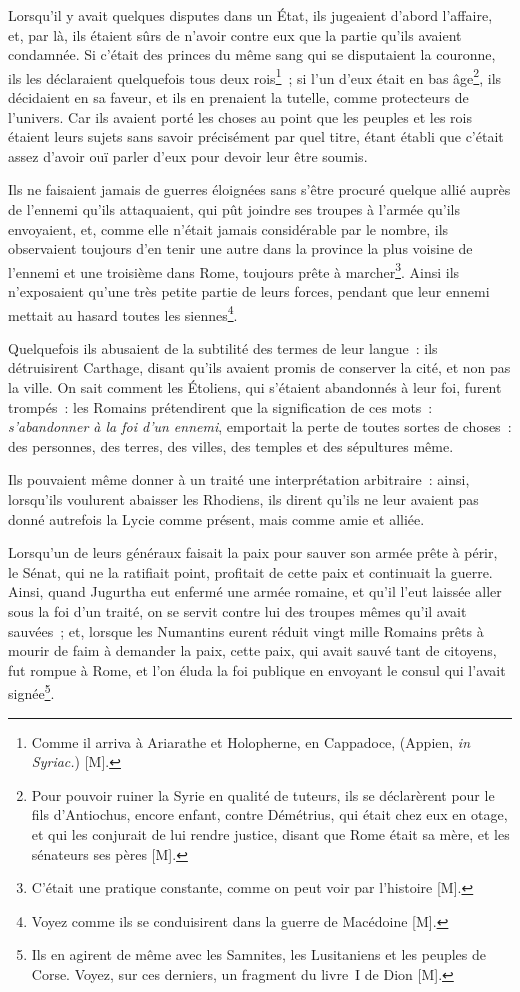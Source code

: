 \documentclass[french,twoside]{book} %
\begin{document}
Lorsqu’il y avait quelques disputes dans un État, ils jugeaient d’abord l’affaire, et, par là, ils étaient sûrs de n’avoir contre eux que la partie qu’ils avaient condamnée. Si c’était des princes du même sang qui se disputaient la couronne, ils les déclaraient quelquefois tous deux rois\footnote{Comme il arriva à Ariarathe et Holopherne, en Cappadoce, (Appien, {\itshape in Syriac.}) [M].} ; si l’un d’eux était en bas âge\footnote{Pour pouvoir ruiner la Syrie en qualité de tuteurs, ils se déclarèrent pour le fils d’Antiochus, encore enfant, contre Démétrius, qui était chez eux en otage, et qui les conjurait de lui rendre justice, disant que Rome était sa mère, et les sénateurs ses pères [M].}, ils décidaient en sa faveur, et ils en prenaient la tutelle, comme protecteurs de l’univers. Car ils avaient porté les choses au point que les peuples et les rois étaient leurs sujets sans savoir précisément par quel titre, étant établi que c’était assez d’avoir ouï parler d’eux pour devoir leur être soumis.\par
Ils ne faisaient jamais de guerres éloignées sans s’être procuré quelque allié auprès de l’ennemi qu’ils attaquaient, qui pût joindre ses troupes à l’armée qu’ils envoyaient, et, comme elle n’était jamais considérable par le nombre, ils observaient toujours d’en tenir une autre dans la province la plus voisine de l’ennemi et une troisième dans Rome, toujours prête à marcher\footnote{C’était une pratique constante, comme on peut voir par l’histoire [M].}. Ainsi ils n’exposaient qu’une très petite partie de leurs forces, pendant que leur ennemi mettait au hasard toutes les siennes\footnote{Voyez comme ils se conduisirent dans la guerre de Macédoine [M].}.\par
Quelquefois ils abusaient de la subtilité des termes de leur langue : ils détruisirent Carthage, disant qu’ils avaient promis de conserver la cité, et non pas la ville. On sait comment les Étoliens, qui s’étaient abandonnés à leur foi, furent trompés : les Romains prétendirent que la signification de ces mots : {\itshape s’abandonner à la foi d’un ennemi}, emportait la perte de toutes sortes de choses : des personnes, des terres, des villes, des temples et des sépultures même.\par
Ils pouvaient même donner à un traité une interprétation arbitraire : ainsi, lorsqu’ils voulurent abaisser les Rhodiens, ils dirent qu’ils ne leur avaient pas donné autrefois la Lycie comme présent, mais comme amie et alliée.\par
Lorsqu’un de leurs généraux faisait la paix pour sauver son armée prête à périr, le Sénat, qui ne la ratifiait point, profitait de cette paix et continuait la guerre. Ainsi, quand Jugurtha eut enfermé une armée romaine, et qu’il l’eut laissée aller sous la foi d’un traité, on se servit contre lui des troupes mêmes qu’il avait sauvées ; et, lorsque les Numantins eurent réduit vingt mille Romains prêts à mourir de faim à demander la paix, cette paix, qui avait sauvé tant de citoyens, fut rompue à Rome, et l’on éluda la foi publique en envoyant le consul qui l’avait signée\footnote{Ils en agirent de même avec les Samnites, les Lusitaniens et les peuples de Corse. Voyez, sur ces derniers, un fragment du livre I de Dion [M].}.\par
\end{document}

